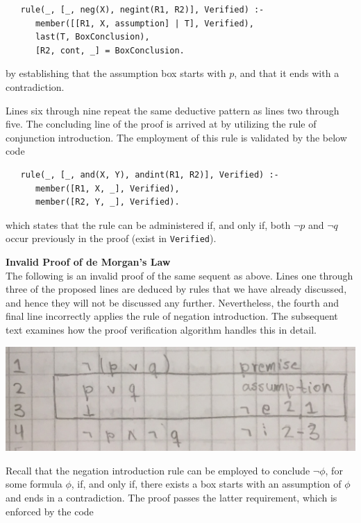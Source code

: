 \documentclass[a4paper, 11pt]{article}
\begin{document}
\begin{enumerate}
\begin{verbatim}
   rule(_, [_, neg(X), negint(R1, R2)], Verified) :-
      member([[R1, X, assumption] | T], Verified),
      last(T, BoxConclusion),
      [R2, cont, _] = BoxConclusion.
\end{verbatim}

            by establishing that the assumption box starts
            with $p$, and that it ends with a contradiction.
            \bigbreak

            Lines six through nine repeat the 
            same deductive pattern as lines two through five.
            The concluding line of the proof is arrived at by
            utilizing the rule of conjunction introduction.
            The employment of this rule is validated by the
            below code

\begin{verbatim}
   rule(_, [_, and(X, Y), andint(R1, R2)], Verified) :-
      member([R1, X, _], Verified),
      member([R2, Y, _], Verified).
\end{verbatim}

            which states that the rule can be administered if,
            and only if, both $\neg p$ and $\neg q$ occur
            previously in the proof (exist in
            \texttt{Verified}).

   \end{enumerate}

   \textbf{Invalid Proof of de Morgan's Law} \\
   The following is an invalid proof of the same sequent as
   above. Lines one through three of the proposed lines are 
   deduced by rules that we have already discussed, and hence 
   they will not be discussed any further. Nevertheless, the
   fourth and final line incorrectly applies the rule of
   negation introduction. The subsequent text examines how the
   proof verification algorithm handles this in detail.   

   \includegraphics[scale=0.25]{de-morgan-invalid}
   
   Recall that the negation introduction rule can be employed
   to conclude $\neg \phi$, for some formula $\phi$, if, and 
   only if, there exists a box starts with an assumption of
   $\phi$ and ends in a contradiction. The proof passes the
   latter requirement, which is enforced by the code
\end{document}
